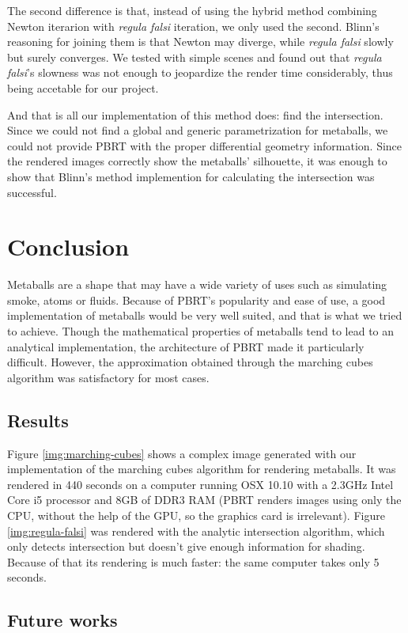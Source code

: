 \documentclass[conference]{acmsiggraph}
\begin{document}
The second difference is that, instead of using the hybrid method combining
Newton iterarion with \textit{regula falsi} iteration, we only used the second.
Blinn's reasoning for joining them is that Newton may diverge, while
\textit{regula falsi} slowly but surely converges. We tested with simple scenes
and found out that \textit{regula falsi}'s slowness was not enough to jeopardize
the render time considerably, thus being accetable for our project.

And that is all our implementation of this method does: find the intersection.
Since we could not find a global and generic parametrization for metaballs, we
could not provide PBRT with the proper differential geometry information. Since
the rendered images correctly show the metaballs' silhouette, it was enough to
show that Blinn's method implemention for calculating the intersection was
successful.

\section{Conclusion}

Metaballs are a shape that may have a wide variety of uses such as simulating smoke, atoms or fluids. Because of PBRT's popularity and ease of use, a good implementation of metaballs would be very well suited, and that is what we tried to achieve. Though the mathematical properties of metaballs tend to lead to an analytical implementation, the architecture of PBRT made it particularly difficult. However, the approximation obtained through the marching cubes algorithm was satisfactory for most cases.

\subsection{Results}

Figure \ref{img:marching-cubes} shows a complex image generated with our implementation of the marching cubes algorithm for rendering metaballs. It was rendered in 440 seconds on a computer running OSX 10.10 with a 2.3GHz Intel Core i5 processor and 8GB of DDR3 RAM (PBRT renders images using only the CPU, without the help of the GPU, so the graphics card is irrelevant). Figure \ref{img:regula-falsi} was rendered with the analytic intersection algorithm, which only detects intersection but doesn't give enough information for shading. Because of that its rendering is much faster: the same computer takes only 5 seconds.

\subsection{Future works}
\end{document}
